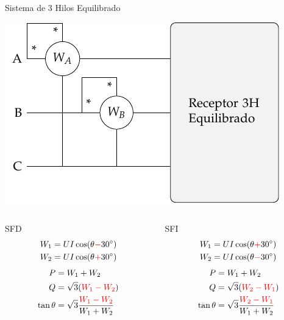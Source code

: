 \documentclass[aspectratio=169, usenames,svgnames,dvipsnames]{beamer}
\begin{document}
\begin{frame}[label={sec:org4c75175}]{Sistema de 3 Hilos Equilibrado}
\begin{center}
\includegraphics[height=0.3\textheight]{../figs/Potencia3H_Equilibrado_AB.pdf}
\end{center}

\begin{columns}
\begin{column}{0.5\columnwidth}
SFD
\begin{align*}
  W_1 &= UI\cos(\theta {\color{red}-} \ang{30})\\
  W_2 &= UI\cos(\theta {\color{red}+} \ang{30})
\end{align*}
\begin{align*}
  P &= W_1 + W_2\\
  Q &= \sqrt{3}({\color{red}W_1 - W_2}) \\
  \tan\theta &= \sqrt{3} \frac{{\color{red}W_1 - W_2}}{W_1 + W_2}
\end{align*}
\end{column}
\begin{column}{0.5\columnwidth}
SFI
\begin{align*}
  W_1 &= UI\cos(\theta {\color{red}+} \ang{30})\\
  W_2 &= UI\cos(\theta {\color{red}-} \ang{30})
\end{align*}
\begin{align*}
  P &= W_1 + W_2\\
  Q &= \sqrt{3}({\color{red}W_2 - W_1}) \\
  \tan\theta &= \sqrt{3} \frac{{\color{red}W_2 - W_1}}{W_1 + W_2}
\end{align*}
\end{column}
\end{columns}
\end{frame}
\end{document}
